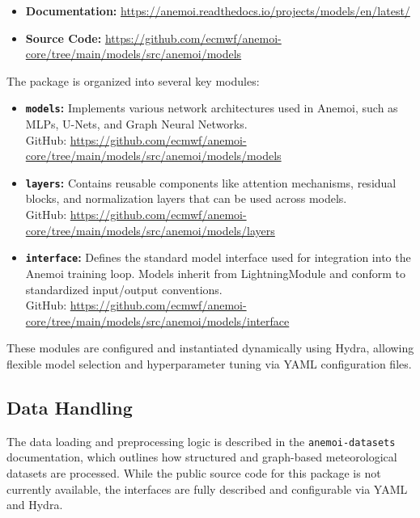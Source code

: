 \begin{itemize}
  \item {\bf Documentation:} \url{https://anemoi.readthedocs.io/projects/models/en/latest/}
  \item {\bf Source Code:} \url{https://github.com/ecmwf/anemoi-core/tree/main/models/src/anemoi/models}
\end{itemize}

The package is organized into several key modules:

\begin{itemize}
  \item {\bf \texttt{models}:} Implements various network architectures used in Anemoi, such as MLPs, U-Nets, and Graph Neural Networks.\\
  GitHub: \url{https://github.com/ecmwf/anemoi-core/tree/main/models/src/anemoi/models/models}
  
  \item {\bf \texttt{layers}:} Contains reusable components like attention mechanisms, residual blocks, and normalization layers that can be used across models.\\
  GitHub: \url{https://github.com/ecmwf/anemoi-core/tree/main/models/src/anemoi/models/layers}
  
  \item {\bf \texttt{interface}:} Defines the standard model interface used for integration into the Anemoi training loop. Models inherit from LightningModule and conform to standardized input/output conventions.\\
  GitHub: \url{https://github.com/ecmwf/anemoi-core/tree/main/models/src/anemoi/models/interface}
\end{itemize}

These modules are configured and instantiated dynamically using Hydra, allowing flexible model selection and hyperparameter tuning via YAML configuration files.

%
\subsection{Data Handling}

The data loading and preprocessing logic is described in the \texttt{anemoi-datasets} documentation, which outlines how structured and graph-based meteorological datasets are processed. While the public source code for this package is not currently available, the interfaces are fully described and configurable via YAML and Hydra.

